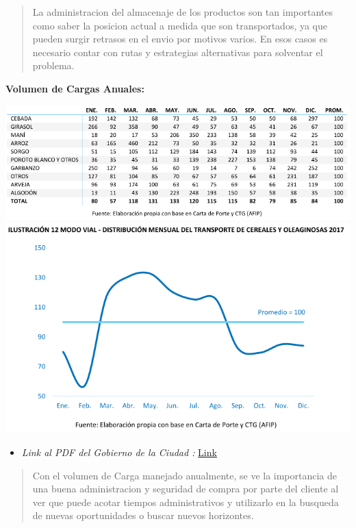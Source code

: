 \documentclass[
10pt, %
a4paper, %
oneside, %
headinclude,footinclude, %
BCOR5mm, %
]{scrartcl}
\begin{document}
  \begin{quotation}
    La administracion del almacenaje de los productos son tan importantes como
    saber la posicion actual a medida que son transportados, ya que pueden
    surgir retrasos en el envio por motivos varios. En esos casos es necesario
    contar con rutas y estrategias alternativas para solventar el problema.
  \end{quotation}
 \textbf{Volumen de Cargas Anuales:}
 \begin{flushleft}
     \includegraphics[width=14cm, keepaspectratio]{images/annual_work_i.png}
     \includegraphics[width=14cm, keepaspectratio]{images/annual_work_ii.png}
 \end{flushleft}
  \begin{itemize}
    \item \textit{Link al PDF del Gobierno de la Ciudad :}
      \href{https://www.argentina.gob.ar/sites/default/files/transporte_terrestre_de_cereales_y_oleaginosas_2017_v1.pdf} {Link}
  \end{itemize}
  \begin{quotation}
    Con el volumen de Carga manejado anualmente, se ve la importancia de una
    buena administracion y seguridad de compra por parte del cliente al ver
    que puede acotar tiempos administrativos y utilizarlo en la busqueda de
    nuevas oportunidades o buscar nuevos horizontes.
  \end{quotation}


\end{document}
